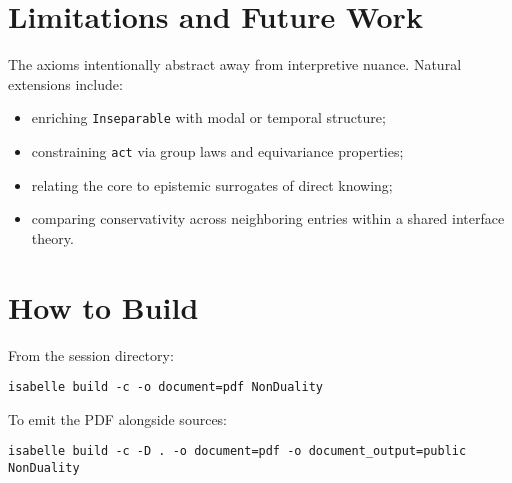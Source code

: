 \documentclass[11pt,a4paper]{article}
\begin{document}
\section{Limitations and Future Work}

The axioms intentionally abstract away from interpretive nuance. Natural
extensions include:
\begin{itemize}
  \item enriching \texttt{Inseparable} with modal or temporal structure;
  \item constraining \texttt{act} via group laws and equivariance properties;
  \item relating the core to epistemic surrogates of direct knowing;
  \item comparing conservativity across neighboring entries within a shared
        interface theory.
\end{itemize}

\section{How to Build}

From the session directory:
\begin{lstlisting}
isabelle build -c -o document=pdf NonDuality
\end{lstlisting}
To emit the PDF alongside sources:
\begin{lstlisting}
isabelle build -c -D . -o document=pdf -o document_output=public NonDuality
\end{lstlisting}

\bigskip



\end{document}
